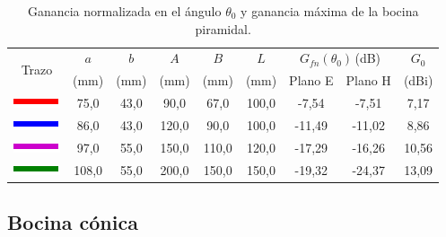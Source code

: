 \begin{table}[H]
\centering
\begin{tabular}{|c|c|c|c|c|c|c|c|c|}
\hline
\multirow{2}{*}{Trazo} & $a$ & $b$ & $A$ & $B$ & $L$ & \multicolumn{2}{c|}{$G_{fn}\left(\theta_0\right)\,$(dB)} & $G_0$ \\
\cline{7-8}
& (mm) & (mm) & (mm) & (mm) & (mm) & Plano E & Plano H & (dBi)\\
\hline
\includegraphics[scale = 1]{Figures/Estudio/linea_tabla_rojo} & 75,0 & 43,0 & 90,0 & 67,0 & 100,0 & -7,54 & -7,51 & 7,17 \\
\hline
\includegraphics[scale = 1]{Figures/Estudio/linea_tabla_azul} & 86,0 & 43,0 & 120,0 & 90,0 & 100,0 & -11,49 & -11,02 & 8,86 \\
\hline
\includegraphics[scale = 1]{Figures/Estudio/linea_tabla_violeta} & 97,0 & 55,0 & 150,0 & 110,0 & 120,0 & -17,29 & -16,26 & 10,56 \\
\hline
\includegraphics[scale = 1]{Figures/Estudio/linea_tabla_verde} & 108,0 & 55,0 & 200,0 & 150,0 & 150,0 & -19,32 & -24,37 & 13,09 \\
\hline
\end{tabular}
\caption{Ganancia normalizada en el ángulo $\theta_0$ y ganancia máxima de la bocina piramidal.}
\label{tabla_estudio:9}
\end{table}

\subsection{Bocina cónica}
\label{subsec_estudio_boci_coni}

